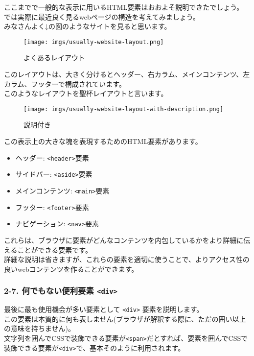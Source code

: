 ここまでで一般的な表示に用いるHTML要素はおおよそ説明できたでしょう。\\
では実際に最近良く見るwebページの構造を考えてみましょう。\\
みなさんよく↓の図のようなサイトを見ると思います。

\begin{figure}
\centering
\texttt{[image: imgs/usually-website-layout.png]}
\caption{よくあるレイアウト}
\end{figure}

このレイアウトは、大きく分けるとヘッダー、右カラム、メインコンテンツ、左カラム、フッターで構成されています。\\
このようなレイアウトを聖杯レイアウトと言います。

\begin{figure}
\centering
\texttt{[image: imgs/usually-website-layout-with-description.png]}
\caption{説明付き}
\end{figure}

この表示上の大きな塊を表現するためのHTML要素があります。

\begin{itemize}
\tightlist
\item
  ヘッダー: \texttt{\textless{}header\textgreater{}}要素
\item
  サイドバー: \texttt{\textless{}aside\textgreater{}}要素
\item
  メインコンテンツ: \texttt{\textless{}main\textgreater{}}要素
\item
  フッター: \texttt{\textless{}footer\textgreater{}}要素
\item
  ナビゲーション: \texttt{\textless{}nav\textgreater{}}要素
\end{itemize}

これらは、ブラウザに要素がどんなコンテンツを内包しているかをより詳細に伝えることができる要素です。\\
詳細な説明は省きますが、これらの要素を適切に使うことで、よりアクセス性の良いwebコンテンツを作ることができます。

\subsubsection{\texorpdfstring{2-7. 何でもない便利要素
\texttt{\textless{}div\textgreater{}}}{2-7. 何でもない便利要素 \textless div\textgreater{}}}\label{ux4f55ux3067ux3082ux306aux3044ux4fbfux5229ux8981ux7d20-div}

最後に最も使用機会が多い要素として \texttt{\textless{}div\textgreater{}}
要素を説明します。\\
この要素は本質的に何も表しません(ブラウザが解釈する際に、ただの囲い以上の意味を持ちません)。\\
文字列を囲んでCSSで装飾できる要素が\texttt{\textless{}span\textgreater{}}だとすれば、要素を囲んでCSSで装飾できる要素が\texttt{\textless{}div\textgreater{}}で、基本そのように利用されます。

